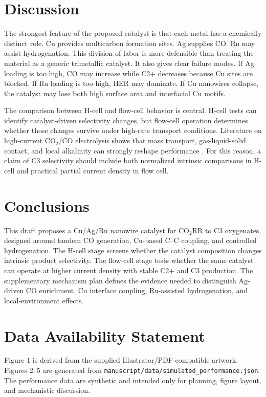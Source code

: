 \documentclass[11pt]{article}
\newcommand{\coTwo}{CO$_2$}
\newcommand{\coTwoRR}{CO$_2$RR}
\begin{document}
\section{Discussion}

The strongest feature of the proposed catalyst is that each metal has a chemically distinct role. Cu provides multicarbon formation sites. Ag supplies CO. Ru may assist hydrogenation. This division of labor is more defensible than treating the material as a generic trimetallic catalyst. It also gives clear failure modes. If Ag loading is too high, CO may increase while C2+ decreases because Cu sites are blocked. If Ru loading is too high, HER may dominate. If Cu nanowires collapse, the catalyst may lose both high surface area and interfacial Cu motifs.

The comparison between H-cell and flow-cell behavior is central. H-cell tests can identify catalyst-driven selectivity changes, but flow-cell operation determines whether those changes survive under high-rate transport conditions. Literature on high-current \coTwo{}/CO electrolysis shows that mass transport, gas-liquid-solid contact, and local alkalinity can strongly reshape performance \cite{Dinh2020,Liu2020}. For this reason, a claim of C3 selectivity should include both normalized intrinsic comparisons in H-cell and practical partial current density in flow cell.

\section{Conclusions}

This draft proposes a Cu/Ag/Ru nanowire catalyst for \coTwoRR{} to C3 oxygenates, designed around tandem CO generation, Cu-based C--C coupling, and controlled hydrogenation. The H-cell stage screens whether the catalyst composition changes intrinsic product selectivity. The flow-cell stage tests whether the same catalyst can operate at higher current density with stable C2+ and C3 production. The supplementary mechanism plan defines the evidence needed to distinguish Ag-driven CO enrichment, Cu interface coupling, Ru-assisted hydrogenation, and local-environment effects.

\section*{Data Availability Statement}

Figure 1 is derived from the supplied Illustrator/PDF-compatible artwork. Figures 2--5 are generated from \texttt{manuscript/data/simulated\_performance.json}. The performance data are synthetic and intended only for planning, figure layout, and mechanistic discussion.
\end{document}
